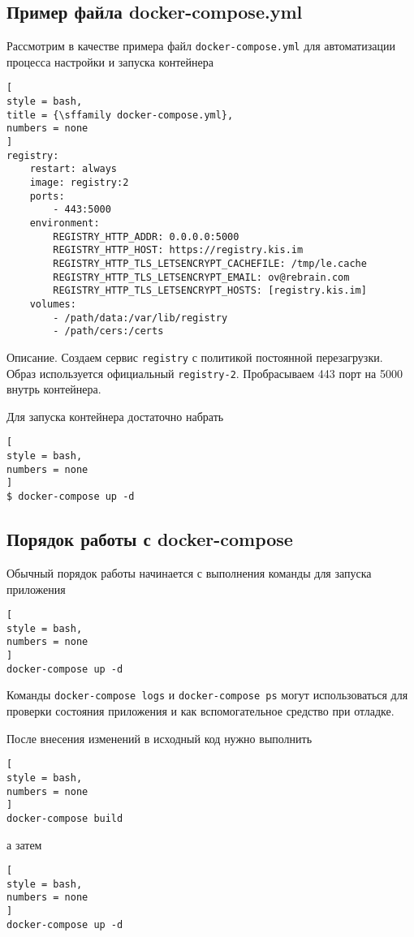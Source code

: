 \documentclass[%
	11pt,
	a4paper,
	utf8,
		]{article}
\begin{document}
\subsection{Пример файла docker-compose.yml}

Рассмотрим в качестве примера файл \texttt{docker-compose.yml} для автоматизации процесса настройки и запуска контейнера
\begin{lstlisting}[
style = bash,
title = {\sffamily docker-compose.yml},
numbers = none
]
registry:
    restart: always
    image: registry:2
    ports:
        - 443:5000
    environment:
        REGISTRY_HTTP_ADDR: 0.0.0.0:5000
        REGISTRY_HTTP_HOST: https://registry.kis.im
        REGISTRY_HTTP_TLS_LETSENCRYPT_CACHEFILE: /tmp/le.cache
        REGISTRY_HTTP_TLS_LETSENCRYPT_EMAIL: ov@rebrain.com
        REGISTRY_HTTP_TLS_LETSENCRYPT_HOSTS: [registry.kis.im]
    volumes:
        - /path/data:/var/lib/registry
        - /path/cers:/certs
\end{lstlisting}

Описание. Создаем сервис \texttt{registry} с политикой постоянной перезагрузки. Образ используется официальный \texttt{registry-2}. Пробрасываем 443 порт на 5000 внутрь контейнера.

Для запуска контейнера достаточно набрать
\begin{lstlisting}[
style = bash,
numbers = none
]
$ docker-compose up -d
\end{lstlisting}

\subsection{Порядок работы с docker-compose}

Обычный порядок работы начинается с выполнения команды для запуска приложения
\begin{lstlisting}[
style = bash,
numbers = none
]
docker-compose up -d
\end{lstlisting}

Команды \texttt{docker-compose logs} и \texttt{docker-compose ps} могут использоваться для проверки состояния приложения и как вспомогательное средство при отладке.

После внесения изменений в исходный код нужно выполнить
\begin{lstlisting}[
style = bash,
numbers = none
]
docker-compose build
\end{lstlisting}
а затем 
\begin{lstlisting}[
style = bash,
numbers = none
]
docker-compose up -d
\end{lstlisting}
\end{document}
